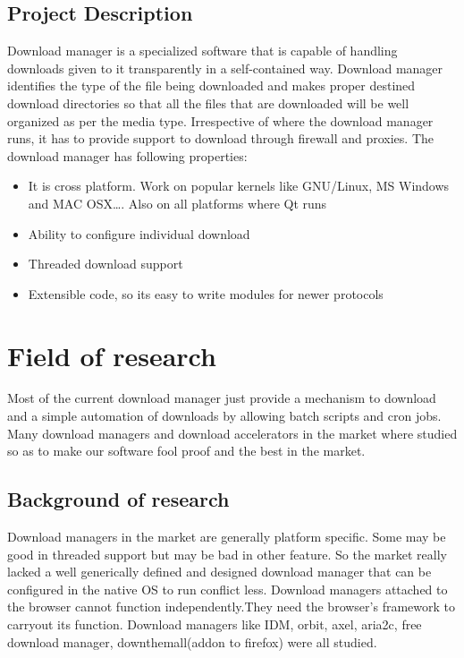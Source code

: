 \documentclass[pdftex,12pt,a4paper,pdfencoding=unicode]{article}
\begin{document}
\begin{onehalfspace}
      \subsection{Project Description}
      Download manager is a specialized software that is capable of handling downloads given to it transparently in a self-contained
      way. Download manager identifies the type of the file being downloaded and makes proper destined download directories so that
      all the files that are downloaded will be well organized as per the media type. Irrespective of where the download manager runs,
      it has to provide support to download through firewall and proxies. The download manager has following properties:
      \begin{itemize}
      \item It is cross platform. Work on popular kernels like GNU/Linux, MS Windows and MAC OSX\ldots. Also on all platforms where Qt runs
      \item Ability to configure individual download
      \item Threaded download support
      \item Extensible code, so its easy to write modules for newer protocols
      \end{itemize}
      \newpage
      \section{Field of research}
      Most of the current download manager just provide a mechanism to download and a simple automation of downloads by allowing batch
      scripts and cron jobs. Many download managers and download accelerators in the market where studied so as to make our software
      fool proof and the best in the market.

      \subsection{Background of research}
      Download managers in the market are generally platform specific. Some may be good in threaded support but may be bad in other feature.
      So the market really lacked a well generically defined and designed download manager that can be configured in the native OS to run
      conflict less. Download managers attached to the browser cannot function independently.They need the browser's framework to carryout
      its function. Download managers like IDM, orbit, axel, aria2c, free download manager, downthemall(addon to firefox) were all studied.


\end{onehalfspace}
\end{document}

